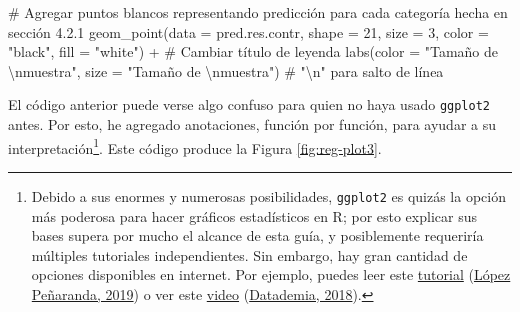 \documentclass[
  bookmarksnumbered]{article}
\newenvironment{Shaded}{\begin{snugshade}}{\end{snugshade}}
\newcommand{\AttributeTok}[1]{\textcolor[rgb]{0.00,0.34,0.68}{#1}}
\newcommand{\CommentTok}[1]{\textcolor[rgb]{0.54,0.53,0.53}{#1}}
\newcommand{\DecValTok}[1]{\textcolor[rgb]{0.69,0.50,0.00}{#1}}
\newcommand{\FunctionTok}[1]{\textcolor[rgb]{0.39,0.29,0.61}{#1}}
\newcommand{\NormalTok}[1]{\textcolor[rgb]{0.12,0.11,0.11}{#1}}
\newcommand{\SpecialCharTok}[1]{\textcolor[rgb]{0.24,0.68,0.91}{#1}}
\newcommand{\StringTok}[1]{\textcolor[rgb]{0.75,0.01,0.01}{#1}}
\begin{document}
\begin{Shaded}
\begin{Highlighting}[]
  \CommentTok{\# Agregar puntos blancos representando predicción para cada categoría hecha en sección 4.2.1}
  \FunctionTok{geom\_point}\NormalTok{(}\AttributeTok{data =}\NormalTok{ pred.res.contr, }\AttributeTok{shape =} \DecValTok{21}\NormalTok{, }\AttributeTok{size =} \DecValTok{3}\NormalTok{, }\AttributeTok{color =} \StringTok{"black"}\NormalTok{, }\AttributeTok{fill =} \StringTok{"white"}\NormalTok{) }\SpecialCharTok{+}
  \CommentTok{\# Cambiar título de leyenda}
  \FunctionTok{labs}\NormalTok{(}\AttributeTok{color =} \StringTok{"Tamaño de }\SpecialCharTok{\textbackslash{}n}\StringTok{muestra"}\NormalTok{, }\AttributeTok{size =} \StringTok{"Tamaño de }\SpecialCharTok{\textbackslash{}n}\StringTok{muestra"}\NormalTok{) }\CommentTok{\# "\textbackslash{}n" para salto de línea}
\end{Highlighting}
\end{Shaded}

El código anterior puede verse algo confuso para quien no haya usado \texttt{ggplot2} antes. Por esto, he agregado anotaciones, función por función, para ayudar a su interpretación\footnote{Debido a sus enormes y numerosas posibilidades, \texttt{ggplot2} es quizás la opción más poderosa para hacer gráficos estadísticos en R; por esto explicar sus bases supera por mucho el alcance de esta guía, y posiblemente requeriría múltiples tutoriales independientes. Sin embargo, hay gran cantidad de opciones disponibles en internet. Por ejemplo, puedes leer este \href{https://rpubs.com/anlope10/562981}{tutorial} (\protect\hyperlink{ref-lopezpenarandaTutorialGgplot22019}{López Peñaranda, 2019}) o ver este \href{https://youtu.be/BUzTAr_QqKs}{video} (\protect\hyperlink{ref-datademiaAprendeGgplot22018}{Datademia, 2018}).}. Este código produce la Figura \ref{fig:reg-plot3}.
\end{document}

